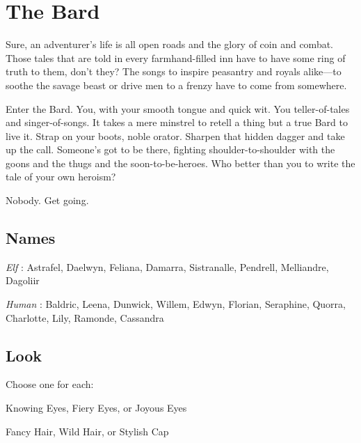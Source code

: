 \chapter{The Bard}
  
 





Sure, an adventurer’s life is all open roads and the glory of coin and combat. Those tales that are told in every farmhand-filled inn have to have some ring of truth to them, don’t they? The songs to inspire peasantry and royals alike—to soothe the savage beast or drive men to a frenzy have to come from somewhere.

 

Enter the Bard. You, with your smooth tongue and quick wit. You teller-of-tales and singer-of-songs. It takes a mere minstrel to retell a thing but a true Bard to live it. Strap on your boots, noble orator. Sharpen that hidden dagger and take up the call. Someone’s got to be there, fighting shoulder-to-shoulder with the goons and the thugs and the soon-to-be-heroes. Who better than you to write the tale of your own heroism?

 

Nobody. Get going.



 
\section{Names}   
 



{\em Elf} : Astrafel, Daelwyn, Feliana, Damarra, Sistranalle, Pendrell, Melliandre, Dagoliir

   

{\em Human} : Baldric, Leena, Dunwick, Willem, Edwyn, Florian, Seraphine, Quorra, Charlotte, Lily, Ramonde, Cassandra



 
\section{Look}  
 



Choose one for each:

 

Knowing Eyes, Fiery Eyes, or Joyous Eyes

 

Fancy Hair, Wild Hair, or Stylish Cap

